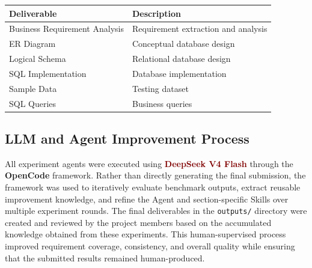 \begin{table}[H]
	\centering
	\begin{tabularx}{\textwidth}{|l|X|}
		\hline
		\textbf{Deliverable} & \textbf{Description} \\
		\hline
		Business Requirement Analysis & Requirement extraction and analysis \\
		\hline
		ER Diagram & Conceptual database design \\
		\hline
		Logical Schema & Relational database design \\
		\hline
		SQL Implementation & Database implementation \\
		\hline
		Sample Data & Testing dataset \\
		\hline
		SQL Queries & Business queries \\
		\hline
	\end{tabularx}
\end{table}

\subsection{LLM and Agent Improvement Process}
All experiment agents were executed using \textbf{\textcolor{Maroon}{DeepSeek V4 Flash}} through the \textbf{OpenCode} framework. Rather than directly generating the final submission, the framework was used to iteratively evaluate benchmark outputs, extract reusable improvement knowledge, and refine the Agent and section-specific Skills over multiple experiment rounds. The final deliverables in the \texttt{outputs/} directory were created and reviewed by the project members based on the accumulated knowledge obtained from these experiments. This human-supervised process improved requirement coverage, consistency, and overall quality while ensuring that the submitted results remained human-produced.